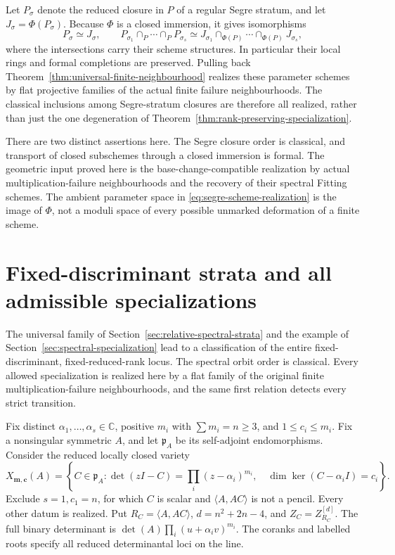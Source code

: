 \documentclass[11pt,reqno]{amsart}
\numberwithin{equation}{section}
\theoremstyle{definition}\newtheorem{definition}[theorem]{Definition}
\theoremstyle{remark}\newtheorem{remark}[theorem]{Remark}
\newcommand{\C}{\mathbb C}\newcommand{\Q}{\mathbb Q}
\begin{document}
Let \(P_\sigma\) denote the reduced closure in \(P\) of a
regular Segre stratum, and let \(J_\sigma=\Phi(P_\sigma)\).
Because \(\Phi\) is a closed immersion, it gives isomorphisms
\begin{equation}\label{eq:segre-scheme-realization}
 P_\sigma\simeq J_\sigma,
 \qquad
 P_{\sigma_1}\cap_P\cdots\cap_P P_{\sigma_s}
 \simeq
 J_{\sigma_1}\cap_{\Phi(P)}\cdots\cap_{\Phi(P)}J_{\sigma_s},
\end{equation}
where the intersections carry their scheme structures.  In
particular their local rings and formal completions are preserved.
Pulling back Theorem~\ref{thm:universal-finite-neighbourhood} realizes
these parameter schemes by flat projective families of the actual
finite failure neighbourhoods.  The classical inclusions among
Segre-stratum closures \cite[Theorem~5.1]{FevolaMandelshtamSturmfels}
are therefore all realized, rather than just the one degeneration
of Theorem~\ref{thm:rank-preserving-specialization}.

There are two distinct assertions here.  The Segre closure order is
classical, and transport of closed subschemes through a closed
immersion is formal.  The geometric input proved here is the
base-change-compatible realization by actual multiplication-failure
neighbourhoods and the recovery of their spectral Fitting schemes.
The ambient parameter space in \eqref{eq:segre-scheme-realization}
is the image of \(\Phi\), not a moduli space of every possible
unmarked deformation of a finite scheme.


\section{Fixed-discriminant strata and all admissible specializations}
\label{sec:fixed-spectral-strata}

The universal family of Section~\ref{sec:relative-spectral-strata}
and the example of Section~\ref{sec:spectral-specialization}
lead to a classification of the entire fixed-discriminant,
fixed-reduced-rank locus. The spectral orbit order is classical.
Every allowed specialization is realized here by a flat family of
the original finite multiplication-failure neighbourhoods, and the
same first relation detects every strict transition.

Fix distinct \(\alpha_1,\ldots,\alpha_s\in\C\), positive
\(m_i\) with \(\sum m_i=n\ge3\), and \(1\le c_i\le m_i\).
Fix a nonsingular symmetric \(A\), and let \(\mathfrak p_A\)
be its self-adjoint endomorphisms. Consider the reduced locally closed
variety
\begin{equation}\label{eq:fixed-spectral-locus}
 X_{\boldsymbol m,\boldsymbol c}(A)=
 \left\{C\in\mathfrak p_A:
 \det(zI-C)=\prod_i(z-\alpha_i)^{m_i},\quad
 \dim\ker(C-\alpha_i I)=c_i\right\}.
\end{equation}
Exclude \(s=1,c_1=n\), for which \(C\) is scalar and
\(\langle A,AC\rangle\) is not a pencil. Every other datum
is realized. Put \(R_C=\langle A,AC\rangle\),
\(d=n^2+2n-4\), and \(Z_C=Z_{R_C}^{[d]}\).
The full binary determinant is
\(\det(A)\prod_i(u+\alpha_i v)^{m_i}\). The coranks and
labelled roots specify all reduced determinantal loci on the line.
\end{document}
